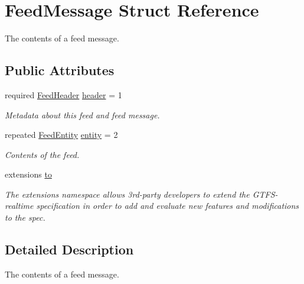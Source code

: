 \hypertarget{structFeedMessage}{}\section{Feed\+Message Struct Reference}
\label{structFeedMessage}


The contents of a feed message.  


\subsection*{Public Attributes}
\begin{DoxyCompactItemize}
\item 
required \hyperlink{structFeedHeader}{Feed\+Header} \hyperlink{structFeedMessage_a470995f7fb38ac3f064f413b9b920164}{header} = 1\hypertarget{structFeedMessage_a470995f7fb38ac3f064f413b9b920164}{}\label{structFeedMessage_a470995f7fb38ac3f064f413b9b920164}

\begin{DoxyCompactList}\small\item\em Metadata about this feed and feed message. \end{DoxyCompactList}\item 
repeated \hyperlink{structFeedEntity}{Feed\+Entity} \hyperlink{structFeedMessage_a2d509ce25e3dc54e3d6b7ecc2c17c842}{entity} = 2\hypertarget{structFeedMessage_a2d509ce25e3dc54e3d6b7ecc2c17c842}{}\label{structFeedMessage_a2d509ce25e3dc54e3d6b7ecc2c17c842}

\begin{DoxyCompactList}\small\item\em Contents of the feed. \end{DoxyCompactList}\item 
extensions \hyperlink{structFeedMessage_a0c9c34fa06eec947bf51cf8b8d1ee0df}{to}
\begin{DoxyCompactList}\small\item\em The extensions namespace allows 3rd-\/party developers to extend the G\+T\+F\+S-\/realtime specification in order to add and evaluate new features and modifications to the spec. \end{DoxyCompactList}\end{DoxyCompactItemize}


\subsection{Detailed Description}
The contents of a feed message. 


